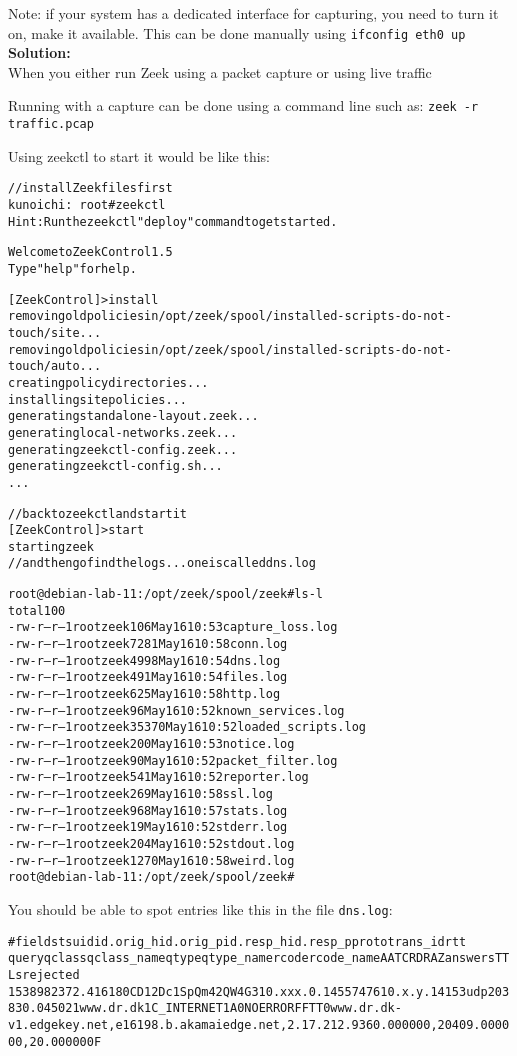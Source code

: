 \documentclass[a4paper,11pt,notitlepage]{report}
\begin{document}
Note: if your system has a dedicated interface for capturing, you need to turn it on, make it available. This can be done manually using \verb+ifconfig eth0 up+
{\bf Solution:}\\
When you either run Zeek using a packet capture or using live traffic

Running with a capture can be done using a command line such as:
\verb+zeek -r traffic.pcap+

Using zeekctl to start it would be like this:
\begin{alltt}\small
// install Zeek files first
kunoichi:~ root# zeekctl
Hint: Run the zeekctl "deploy" command to get started.

Welcome to ZeekControl 1.5
Type "help" for help.

[ZeekControl] > install
removing old policies in /opt/zeek/spool/installed-scripts-do-not-touch/site ...
removing old policies in /opt/zeek/spool/installed-scripts-do-not-touch/auto ...
creating policy directories ...
installing site policies ...
generating standalone-layout.zeek ...
generating local-networks.zeek ...
generating zeekctl-config.zeek ...
generating zeekctl-config.sh ...
...
\end{alltt}

\begin{alltt}\small
// back to zeekctl and start it
[ZeekControl] > start
starting zeek
// and then go find the logs ... one is called dns.log

root@debian-lab-11:/opt/zeek/spool/zeek# ls -l
total 100
-rw-r--r-- 1 root zeek   106 May 16 10:53 capture_loss.log
-rw-r--r-- 1 root zeek  7281 May 16 10:58 conn.log
-rw-r--r-- 1 root zeek  4998 May 16 10:54 dns.log
-rw-r--r-- 1 root zeek   491 May 16 10:54 files.log
-rw-r--r-- 1 root zeek   625 May 16 10:58 http.log
-rw-r--r-- 1 root zeek    96 May 16 10:52 known_services.log
-rw-r--r-- 1 root zeek 35370 May 16 10:52 loaded_scripts.log
-rw-r--r-- 1 root zeek   200 May 16 10:53 notice.log
-rw-r--r-- 1 root zeek    90 May 16 10:52 packet_filter.log
-rw-r--r-- 1 root zeek   541 May 16 10:52 reporter.log
-rw-r--r-- 1 root zeek   269 May 16 10:58 ssl.log
-rw-r--r-- 1 root zeek   968 May 16 10:57 stats.log
-rw-r--r-- 1 root zeek    19 May 16 10:52 stderr.log
-rw-r--r-- 1 root zeek   204 May 16 10:52 stdout.log
-rw-r--r-- 1 root zeek  1270 May 16 10:58 weird.log
root@debian-lab-11:/opt/zeek/spool/zeek#
\end{alltt}

You should be able to spot entries like this in the file \verb+dns.log+:
\begin{alltt}\small
#fields ts      uid     id.orig_h       id.orig_p       id.resp_h       id.resp_p       proto   trans_id        rtt
     query   qclass  qclass_name     qtype   qtype_name      rcode   rcode_name      AA      TC      RD      RA      Z       answers TTLs    rejected
1538982372.416180	CD12Dc1SpQm42QW4G3	10.xxx.0.145	57476	10.x.y.141	53	udp	20383	0.045021	www.dr.dk	1	C_INTERNET	1	A	0	NOERROR	F	F	T	T	0	www.dr.dk-v1.edgekey.net,e16198.b.akamaiedge.net,2.17.212.93	60.000000,20409.000000,20.000000	F
\end{alltt}
\end{document}
